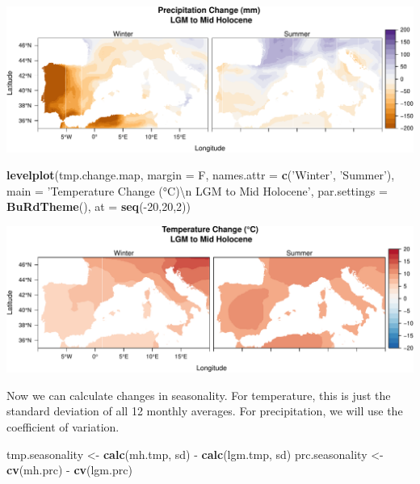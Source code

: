 \documentclass[11pt,]{tufte-handout}
\newenvironment{Shaded}{}{}
\newcommand{\KeywordTok}[1]{\textcolor[rgb]{0.00,0.44,0.13}{\textbf{{#1}}}}
\newcommand{\DataTypeTok}[1]{\textcolor[rgb]{0.56,0.13,0.00}{{#1}}}
\newcommand{\DecValTok}[1]{\textcolor[rgb]{0.25,0.63,0.44}{{#1}}}
\newcommand{\CharTok}[1]{\textcolor[rgb]{0.25,0.44,0.63}{{#1}}}
\newcommand{\StringTok}[1]{\textcolor[rgb]{0.25,0.44,0.63}{{#1}}}
\newcommand{\NormalTok}[1]{{#1}}
\begin{document}
\includegraphics{climate-analysis_files/figure-latex/unnamed-chunk-10-2}

\begin{Shaded}
\begin{Highlighting}[]
\KeywordTok{levelplot}\NormalTok{(tmp.change.map, }\DataTypeTok{margin =} \NormalTok{F, }\DataTypeTok{names.attr =} \KeywordTok{c}\NormalTok{(}\StringTok{'Winter'}\NormalTok{, }\StringTok{'Summer'}\NormalTok{), }
          \DataTypeTok{main =} \StringTok{'Temperature Change (°C)}\CharTok{\textbackslash{}n}\StringTok{ LGM to Mid Holocene'}\NormalTok{,}
          \DataTypeTok{par.settings =} \KeywordTok{BuRdTheme}\NormalTok{(),}
          \DataTypeTok{at =} \KeywordTok{seq}\NormalTok{(-}\DecValTok{20}\NormalTok{,}\DecValTok{20}\NormalTok{,}\DecValTok{2}\NormalTok{))}
\end{Highlighting}
\end{Shaded}

\includegraphics{climate-analysis_files/figure-latex/unnamed-chunk-10-3}

Now we can calculate changes in seasonality. For temperature, this is
just the standard deviation of all 12 monthly averages. For
precipitation, we will use the coefficient of variation.

\begin{Shaded}
\begin{Highlighting}[]
\NormalTok{tmp.seasonality <-}\StringTok{ }\KeywordTok{calc}\NormalTok{(mh.tmp, sd) -}\StringTok{ }\KeywordTok{calc}\NormalTok{(lgm.tmp, sd)}
\NormalTok{prc.seasonality <-}\StringTok{ }\KeywordTok{cv}\NormalTok{(mh.prc) -}\StringTok{ }\KeywordTok{cv}\NormalTok{(lgm.prc)}
\end{Highlighting}
\end{Shaded}
\end{document}
